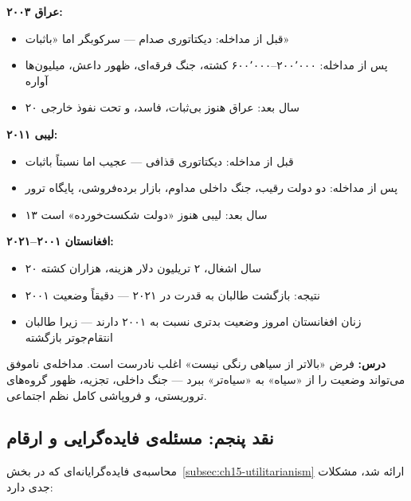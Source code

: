 \begin{tcolorbox}[enemybox, title={وقتی مداخله وضع را بدتر کرد: سه نمونه}]
\textbf{عراق ۲۰۰۳:}
\begin{itemize}
\item قبل از مداخله: دیکتاتوری صدام — سرکوبگر اما «باثبات»
\item پس از مداخله: ۲۰۰٬۰۰۰–۶۰۰٬۰۰۰ کشته، جنگ فرقه‌ای، ظهور داعش، میلیون‌ها آواره
\item ۲۰ سال بعد: عراق هنوز بی‌ثبات، فاسد، و تحت نفوذ خارجی
\end{itemize}

\textbf{لیبی ۲۰۱۱:}
\begin{itemize}
\item قبل از مداخله: دیکتاتوری قذافی — عجیب اما نسبتاً باثبات
\item پس از مداخله: دو دولت رقیب، جنگ داخلی مداوم، بازار برده‌فروشی، پایگاه ترور
\item ۱۳ سال بعد: لیبی هنوز «دولت شکست‌خورده» است
\end{itemize}

\textbf{افغانستان ۲۰۰۱–۲۰۲۱:}
\begin{itemize}
\item ۲۰ سال اشغال، ۲ تریلیون دلار هزینه، هزاران کشته
\item نتیجه: بازگشت طالبان به قدرت در ۲۰۲۱ — دقیقاً وضعیت ۲۰۰۱
\item زنان افغانستان امروز وضعیت بدتری نسبت به ۲۰۰۱ دارند — زیرا طالبان انتقام‌جوتر بازگشته
\end{itemize}
\end{tcolorbox}

\textbf{درس:} فرض «بالاتر از سیاهی رنگی نیست» اغلب نادرست است. مداخله‌ی ناموفق می‌تواند وضعیت را از «سیاه» به «سیاه‌تر» ببرد — جنگ داخلی، تجزیه، ظهور گروه‌های تروریستی، و فروپاشی کامل نظم اجتماعی.


\subsection{نقد پنجم: مسئله‌ی فایده‌گرایی و ارقام}
\label{subsec:ch15-critique-utilitarian-numbers}

محاسبه‌ی فایده‌گرایانه‌ای که در بخش~\ref{subsec:ch15-utilitarianism} ارائه شد، مشکلات جدی دارد:

